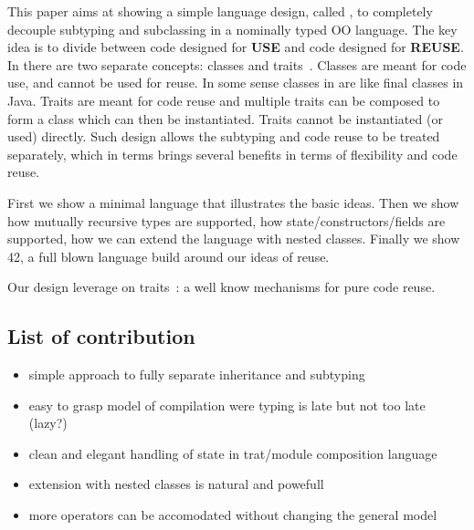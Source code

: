 This paper aims at showing a simple language design, called \name, to
completely decouple subtyping and subclassing in a nominally typed OO
language. The key idea is to divide between code designed for
\textbf{USE} and code designed for \textbf{REUSE}. 
In \name there are two separate concepts: classes
and traits~\cite{}. Classes are meant for code use, and cannot be used
for reuse. In some sense classes in \name are like final classes in
Java. Traits are meant for code reuse and multiple traits can be
composed to form a class which can then be instantiated. Traits 
cannot be instantiated (or used) directly. Such design allows the
subtyping and code reuse to be treated separately, which in terms 
brings several benefits in terms of flexibility and code reuse.

First we show a minimal language that illustrates the basic ideas. 
Then we show how mutually recursive types
are supported, how state/constructors/fields are supported,
how we can extend the language with nested classes.
Finally we show 42, a full blown language build around our ideas of
reuse.

Our design leverage on traits~\cite{ducasse2006traits}: a well know mechanisms for pure
code reuse.


\subsection{List of contribution}
\begin{itemize}
\item simple approach to fully separate inheritance and subtyping
\item easy to grasp model of compilation were typing is late but not
  too late (lazy?)
\item clean and elegant handling of state in trat/module composition language
\item extension with nested classes is natural and
  powefull
\item more operators can be accomodated without changing the general model
\end{itemize}

